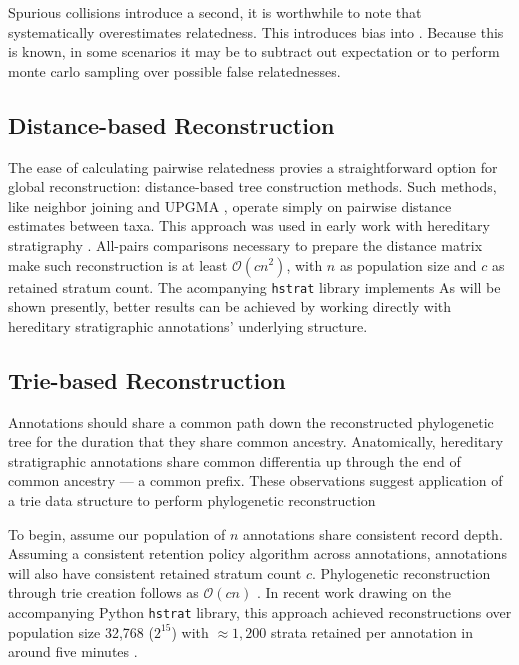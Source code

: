 Spurious collisions introduce a second, it is worthwhile to note that systematically overestimates relatedness.
This introduces bias into .
Because this is known, in some scenarios it may be to subtract out expectation or to perform monte carlo sampling over possible false relatednesses.

\subsection{Distance-based Reconstruction}

The ease of calculating pairwise relatedness provies a straightforward option for global reconstruction: distance-based tree construction methods.
Such methods, like neighbor joining and UPGMA \citep{peng2007distance}, operate simply on pairwise distance estimates between taxa.
This approach was used in early work with hereditary stratigraphy \citep{moreno2022hereditary}.
All-pairs comparisons necessary to prepare the distance matrix make such reconstruction is at least $\mathcal{O}(c n^2)$, with $n$ as population size and $c$ as retained stratum count.
The acompanying \texttt{hstrat} library implements
As will be shown presently, better results can be achieved by working directly with hereditary stratigraphic annotations' underlying structure.  

\subsection{Trie-based Reconstruction}

Annotations should share a common path down the reconstructed phylogenetic tree for the duration that they share common ancestry. 
Anatomically, hereditary stratigraphic annotations share common differentia up through the end of common ancestry --- a common prefix.
These observations suggest application of a trie data structure to perform phylogenetic reconstruction \citep{fredkin1960trie}

To begin, assume our population of $n$ annotations share consistent record depth.
Assuming a consistent retention policy algorithm across annotations, annotations will also have consistent retained stratum count $c$.
Phylogenetic reconstruction through trie creation follows as $\mathcal{O}(c n)$ \citep{mehta2018handbook}.
In recent work drawing on the accompanying Python \texttt{hstrat} library, this approach achieved reconstructions over population size 32,768 ($2^15$) with $\approx 1,200$ strata retained per annotation in around five minutes \citep{moreno2023toward}.

